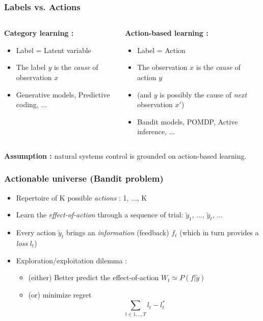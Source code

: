 \documentclass{beamer}
\begin{document}
\begin{frame}\frametitle{Labels vs. Actions}
	\begin{columns}
		
		\begin{column}{.48 \linewidth}
			{\bf Category learning :}
			\begin{itemize}
			\item Label = Latent variable
			\item The label $y$ is the \emph{cause} of observation $x$ 
			\item Generative models, Predictive coding, ...
			\end{itemize}
		\end{column}

		\begin{column}{.48 \linewidth}
			{\bf Action-based learning :}
			\begin{itemize}
			\item Label = Action
			\item The observation $x$ is the \emph{cause} of action $y$
			\item (and $y$ is possibly the cause of \emph{next} observation $x'$)
			\item Bandit models, POMDP, Active inference, ...
			\end{itemize}
		\end{column}
	\end{columns}
\begin{exampleblock}{}
	{\bf Assumption :} natural systems control is grounded on action-based learning.
\end{exampleblock}
\end{frame}

\begin{frame}\frametitle{Actionable universe (Bandit problem)}
	\begin{itemize}
		\item Repertoire of K possible \emph{actions} : 1, ..., K
		\item Learn the \emph{effect-of-action} through a sequence of trial: $\tilde {y}_1$, ..., $\tilde{y}_t$, ...
		\item Every action $\tilde{y}_t$ brings an \textit{information} (feedback) $f_t$ 
		(which in turn provides a \textit{loss} $l_t$)
		\item Exploration/exploitation dilemma :
		\begin{itemize}
			\item (either) Better predict the effect-of-action $W_t \simeq P(f|\tilde{y})$
			\item (or) minimize regret $$ \sum_{t \in 1,..,T} l_t - l^*_t$$ 
		\end{itemize}
	\end{itemize}
\end{frame}
\end{document}
